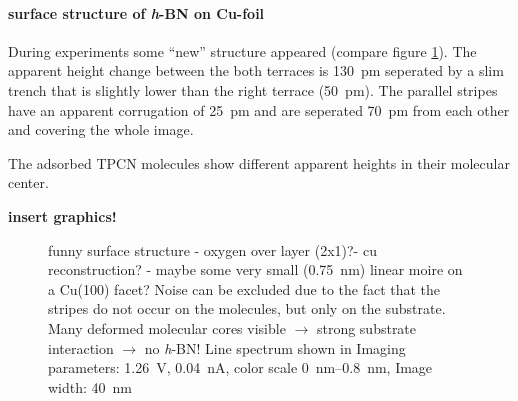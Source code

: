 \paragraph{surface structure of \textit{h}-BN on Cu-foil}



During experiments some ``new'' structure appeared (compare figure \ref{fig:tpcn-on-cu-foil}).
The apparent height change between the both terraces is \SI{130}{\pico \meter} seperated by a slim 
trench that is slightly lower than the right terrace (\SI{50}{\pico \meter}). The parallel stripes have an apparent corrugation of \SI{25}{\pico \meter} and are seperated \SI{70}{\pico \meter} from each other and covering the whole image. 

The adsorbed TPCN molecules show different apparent heights in their molecular center.

\textbf{insert graphics!}
\begin{figure}
 \centering
  \quad

 \caption{funny surface structure - oxygen over layer (2x1)?- cu reconstruction? - maybe some very small (\SI{0.75}{\nm}) linear moire on a Cu(100) facet? Noise can be excluded due to the fact that the stripes do not occur on the molecules, but only on the substrate. Many deformed molecular cores visible $\rightarrow$ strong substrate interaction $\rightarrow$  no \textit{h}-BN! Line spectrum shown in  Imaging parameters: 		
 	\SI{1.26}{\volt}, \SI{0.04}{\nano\ampere}, 
 	color scale \SIrange{0}{0.8}{\nano \meter}, 
 	Image width: \SI{40}{\nano \meter} }
\label{fig:tpcn-on-cu-foil}
\end{figure}
